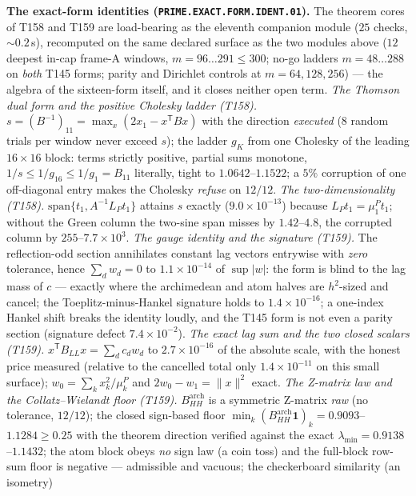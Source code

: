 \documentclass[11pt,a4paper]{article}
\theoremstyle{definition}
\begin{document}
\par\smallskip\noindent\textbf{The exact-form identities
(\texttt{PRIME.EXACT.FORM.IDENT.01}).}
The theorem cores of T158 and T159 are load-bearing as the eleventh
companion module ($25$ checks, ${\sim}0.2$\,s), recomputed on the same
declared surface as the two modules above ($12$ deepest in-cap frame-A
windows, $m=96\ldots291\le300$; no-go ladders $m=48\ldots288$ on
\emph{both} T145 forms; parity and Dirichlet controls at $m=64,128,256$)
--- the algebra of the sixteen-form itself, and it closes neither open
term.
\emph{The Thomson dual form and the positive Cholesky ladder (T158).}
$s=(B^{-1})_{11}=\max_x(2x_1-x^{\mathsf T}Bx)$ with the direction
\emph{executed} ($8$ random trials per window never exceed $s$); the
ladder $g_K$ from one Cholesky of the leading $16\times16$ block: terms
strictly positive, partial sums monotone, $1/s\le1/g_{16}\le1/g_1=B_{11}$
literally, tight to $1.0642$--$1.1522$; a $5\%$ corruption of one
off-diagonal entry makes the Cholesky \emph{refuse} on $12/12$.
\emph{The two-dimensionality (T158).} $\mathrm{span}\{t_1,A^{-1}L_Pt_1\}$
attains $s$ exactly ($9.0\times10^{-13}$) because $L_Pt_1=\mu^P_1t_1$;
without the Green column the two-sine span misses by $1.42$--$4.8$, the
corrupted column by $255$--$7.7\times10^{3}$.
\emph{The gauge identity and the signature (T159).} The reflection-odd
section annihilates constant lag vectors entrywise with \emph{zero}
tolerance, hence $\sum_dw_d=0$ to $1.1\times10^{-14}$ of $\sup|w|$: the
form is blind to the lag mass of $c$ --- exactly where the archimedean
and atom halves are $h^2$-sized and cancel; the Toeplitz-minus-Hankel
signature holds to $1.4\times10^{-16}$; a one-index Hankel shift breaks
the identity loudly, and the T145 form is not even a parity section
(signature defect $7.4\times10^{-2}$).
\emph{The exact lag sum and the two closed scalars (T159).}
$x^{\mathsf T}B_{LL}x=\sum_dc_dw_d$ to $2.7\times10^{-16}$ of the
absolute scale, with the honest price measured (relative to the
cancelled total only $1.4\times10^{-11}$ on this small surface);
$w_0=\sum_kx_k^2/\mu^P_k$ and $2w_0-w_1=\|x\|^2$ exact.
\emph{The Z-matrix law and the Collatz--Wielandt floor (T159).}
$B^{\mathrm{arch}}_{HH}$ is a symmetric Z-matrix \emph{raw} (no
tolerance, $12/12$); the closed sign-based floor
$\min_k(B^{\mathrm{arch}}_{HH}\mathbf 1)_k=0.9093$--$1.1284\ge0.25$ with
the theorem direction verified against the exact
$\lambda_{\min}=0.9138$--$1.1432$; the atom block obeys \emph{no} sign
law (a coin toss) and the full-block row-sum floor is negative ---
admissible and vacuous; the checkerboard similarity (an isometry)
\end{document}
